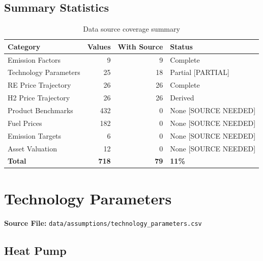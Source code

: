 \documentclass[12pt,a4paper]{article}
\newcommand{\sourceok}[1]{\textcolor{sourcegreen}{#1}}
\newcommand{\nosource}[1]{\textcolor{sourcered}{#1 [SOURCE NEEDED]}}
\newcommand{\partialsource}[1]{\textcolor{sourceyellow}{#1 [PARTIAL]}}
\begin{document}
\subsection{Summary Statistics}

\begin{table}[H]
\centering
\begin{tabular}{lrrl}
\toprule
\textbf{Category} & \textbf{Values} & \textbf{With Source} & \textbf{Status} \\
\midrule
Emission Factors & 9 & 9 & \sourceok{Complete} \\
Technology Parameters & 25 & 18 & \partialsource{Partial} \\
RE Price Trajectory & 26 & 26 & \sourceok{Complete} \\
H2 Price Trajectory & 26 & 26 & \sourceok{Derived} \\
Product Benchmarks & 432 & 0 & \nosource{None} \\
Fuel Prices & 182 & 0 & \nosource{None} \\
Emission Targets & 6 & 0 & \nosource{None} \\
Asset Valuation & 12 & 0 & \nosource{None} \\
\midrule
\textbf{Total} & \textbf{718} & \textbf{79} & \textbf{11\%} \\
\bottomrule
\end{tabular}
\caption{Data source coverage summary}
\end{table}

\section{Technology Parameters}
\label{sec:technology}

\textbf{Source File:} \texttt{data/assumptions/technology\_parameters.csv}

\subsection{Heat Pump}
\end{document}

